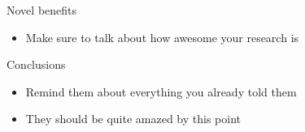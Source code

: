 \documentclass[final, usenames, dvipsnames]{beamer}
\newlength{\onecolwidth}
\begin{document}
\begin{frame}[t]
\begin{columns}[T,onlytextwidth]
\begin{column}{\onecolwidth} %

\begin{block}{Novel benefits} %
	\begin{itemize}
		\item Make sure to talk about how awesome your research is
	\end{itemize}
\end{block} %

\begin{block}{Conclusions} %
	\begin{itemize}
		\item Remind them about everything you already told them
		\item They should be quite amazed by this point
	\end{itemize}
\end{block} %
\end{column}  %

\end{columns} %
\end{frame} %
\end{document}
